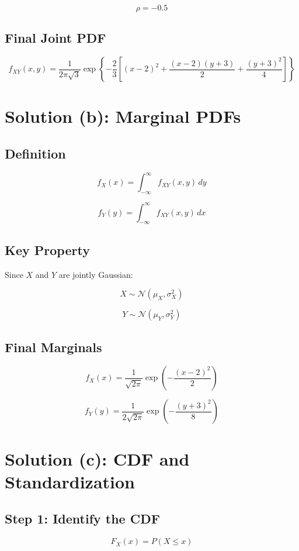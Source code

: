 \documentclass[11pt]{article}
\begin{document}
\[
\rho = -0.5
\]

\subsection{Final Joint PDF}

\[
f_{XY}(x,y)
=
\frac{1}{2\pi \sqrt{3}}
\exp \left\{
-\frac{2}{3}
\left[
(x-2)^2
+
\frac{(x-2)(y+3)}{2}
+
\frac{(y+3)^2}{4}
\right]
\right\}
\]

\section{Solution (b): Marginal PDFs}

\subsection{Definition}

\[
f_X(x)
=
\int_{-\infty}^{\infty}
f_{XY}(x,y)\,dy
\]

\[
f_Y(y)
=
\int_{-\infty}^{\infty}
f_{XY}(x,y)\,dx
\]

\subsection{Key Property}

Since $X$ and $Y$ are jointly Gaussian:

\[
X \sim \mathcal{N}(\mu_X, \sigma_X^2)
\]

\[
Y \sim \mathcal{N}(\mu_Y, \sigma_Y^2)
\]

\subsection{Final Marginals}

\[
f_X(x)
=
\frac{1}{\sqrt{2\pi}}
\exp\left(-\frac{(x-2)^2}{2}\right)
\]

\[
f_Y(y)
=
\frac{1}{2\sqrt{2\pi}}
\exp\left(-\frac{(y+3)^2}{8}\right)
\]

\section{Solution (c): CDF and Standardization}

\subsection{Step 1: Identify the CDF}

\[
F_X(x) = P(X \le x)
\]
\end{document}
